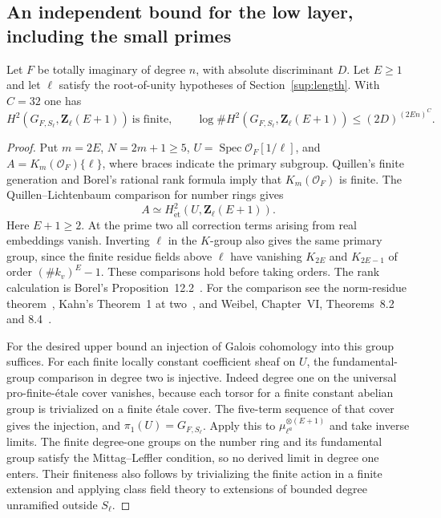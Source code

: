 \subsection{An independent bound for the low layer, including the small primes}
\label{newcoh:ktheory}

\begin{theorem}\label{newcoh:lemmaK}
Let \(F\) be totally imaginary of degree \(n\), with absolute
discriminant \(D\). Let \(E\ge1\) and let \(\ell\) satisfy the
root-of-unity hypotheses of Section~\ref{sup:length}. With \(C=32\)
one has
\[
 H^2(G_{F,S_\ell},\mathbf Z_\ell(E+1))\ \text{is finite},\qquad
 \log\#H^2(G_{F,S_\ell},\mathbf Z_\ell(E+1))
 \le (2D)^{(2En)^C}.
\]
\end{theorem}
\begin{proof}
Put \(m=2E\), \(N=2m+1\ge5\), \(U=\operatorname{Spec}
\mathcal O_F[1/\ell]\), and \(A=K_m(\mathcal O_F)\{\ell\}\), where
braces indicate the primary subgroup. Quillen's finite generation and
Borel's rational rank formula imply that \(K_m(\mathcal O_F)\) is
finite. The Quillen--Lichtenbaum comparison for number rings gives
\[
 A\simeq H^2_{\mathrm{\acute et}}(U,\mathbf Z_\ell(E+1)).
\]
Here \(E+1\ge2\). At the prime two all correction terms arising from
real embeddings vanish. Inverting \(\ell\) in the \(K\)-group also
gives the same primary group, since the finite residue fields above
\(\ell\) have vanishing \(K_{2E}\) and \(K_{2E-1}\) of order
\((\#k_v)^E-1\). These comparisons hold before taking orders.
The rank calculation is Borel's Proposition~12.2~\cite{borelStable}.
For the comparison see the norm-residue theorem~\cite{voevodskyNorm},
Kahn's Theorem~1 at two~\cite{kahnTwo}, and Weibel, Chapter~VI,
Theorems~8.2 and 8.4~\cite{weibelKbook}.

For the desired upper bound an injection of Galois cohomology into
this group suffices. For each finite locally constant coefficient sheaf
on \(U\), the fundamental-group comparison in degree two is injective.
Indeed degree one on the universal pro-finite-\'etale cover vanishes,
because each torsor for a finite constant abelian group is trivialized
on a finite \'etale cover. The five-term sequence of that cover gives
the injection, and \(\pi_1(U)=G_{F,S_\ell}\). Apply this to
\(\mu_{\ell^a}^{\otimes(E+1)}\) and take inverse limits. The finite
degree-one groups on the number ring and its fundamental group satisfy
the Mittag--Leffler condition, so no derived limit in degree one enters.
Their finiteness also follows by trivializing the finite action in a
finite extension and applying class field theory to extensions of
bounded degree unramified outside \(S_\ell\).


\end{proof}
